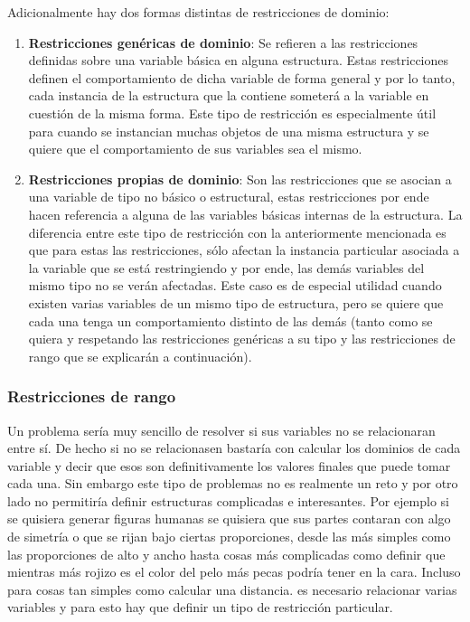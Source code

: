 Adicionalmente hay dos formas distintas de restricciones de dominio:

\begin{enumerate}
	\item {\textbf{Restricciones genéricas de dominio}:
Se refieren a las restricciones definidas sobre una variable básica
en alguna estructura. Estas restricciones definen el comportamiento de dicha 
variable de forma general y por lo tanto, cada instancia de la estructura que la 
contiene someterá a la variable en cuestión de la misma forma. Este tipo de 
restricción es especialmente útil para cuando se instancian muchas objetos de una 
misma estructura y se quiere que el comportamiento de sus variables sea el mismo.}

	\item {\textbf{Restricciones propias de dominio}: 
Son las restricciones que se asocian a 
una variable de tipo no básico o estructural, estas restricciones por ende hacen 
referencia a alguna de las variables básicas internas de la estructura. La 
diferencia entre este tipo de restricción con la anteriormente mencionada es que 
para estas las restricciones, sólo afectan la instancia particular asociada a la 
variable que se está restringiendo y por ende, las demás variables del mismo tipo 
no se verán afectadas. Este caso es de especial utilidad cuando existen varias 
variables de un mismo tipo de estructura, pero se quiere que cada una tenga un 
comportamiento distinto de las demás (tanto como se quiera y respetando las 
restricciones genéricas a su tipo y las restricciones de rango que se explicarán 
a continuación).}
\end{enumerate}


	
\subsubsection{Restricciones de rango}
Un problema sería muy sencillo de resolver si sus variables no se relacionaran 
entre sí. De hecho si no se relacionasen bastaría con calcular los dominios de 
cada variable y decir que esos son definitivamente los valores finales que puede 
tomar cada una. Sin embargo este tipo de problemas no es realmente un reto y por 
otro lado no permitiría definir estructuras complicadas e interesantes. Por 
ejemplo si se quisiera generar figuras humanas se quisiera que sus partes 
contaran con algo de simetría o que se rijan bajo ciertas proporciones, desde las 
más simples como las proporciones de alto y ancho hasta cosas más complicadas 
como definir que mientras más rojizo es el color del pelo más pecas podría tener 
en la cara. Incluso para cosas tan simples como calcular una distancia. es 
necesario relacionar varias variables y para esto hay que definir un tipo de 
restricción particular.

